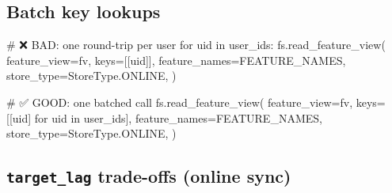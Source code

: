 \documentclass[
  letterpaper,
  DIV=11,
  numbers=noendperiod]{scrreprt}
\newenvironment{Shaded}{\begin{snugshade}}{\end{snugshade}}
\newcommand{\CommentTok}[1]{\textcolor[rgb]{0.37,0.37,0.37}{#1}}
\newcommand{\ControlFlowTok}[1]{\textcolor[rgb]{0.00,0.23,0.31}{#1}}
\newcommand{\KeywordTok}[1]{\textcolor[rgb]{0.00,0.23,0.31}{#1}}
\newcommand{\NormalTok}[1]{\textcolor[rgb]{0.00,0.23,0.31}{#1}}
\newcommand{\OperatorTok}[1]{\textcolor[rgb]{0.37,0.37,0.37}{#1}}
\begin{document}
\hypertarget{batch-key-lookups}{%
\subsection{Batch key lookups}\label{batch-key-lookups}}

\begin{Shaded}
\begin{Highlighting}[]
\CommentTok{\# ❌ BAD: one round{-}trip per user}
\ControlFlowTok{for}\NormalTok{ uid }\KeywordTok{in}\NormalTok{ user\_ids:}
\NormalTok{    fs.read\_feature\_view(}
\NormalTok{        feature\_view}\OperatorTok{=}\NormalTok{fv,}
\NormalTok{        keys}\OperatorTok{=}\NormalTok{[[uid]],}
\NormalTok{        feature\_names}\OperatorTok{=}\NormalTok{FEATURE\_NAMES,}
\NormalTok{        store\_type}\OperatorTok{=}\NormalTok{StoreType.ONLINE,}
\NormalTok{    )}

\CommentTok{\# ✅ GOOD: one batched call}
\NormalTok{fs.read\_feature\_view(}
\NormalTok{    feature\_view}\OperatorTok{=}\NormalTok{fv,}
\NormalTok{    keys}\OperatorTok{=}\NormalTok{[[uid] }\ControlFlowTok{for}\NormalTok{ uid }\KeywordTok{in}\NormalTok{ user\_ids],}
\NormalTok{    feature\_names}\OperatorTok{=}\NormalTok{FEATURE\_NAMES,}
\NormalTok{    store\_type}\OperatorTok{=}\NormalTok{StoreType.ONLINE,}
\NormalTok{)}
\end{Highlighting}
\end{Shaded}

\hypertarget{target_lag-trade-offs-online-sync}{%
\subsection{\texorpdfstring{\texttt{target\_lag} trade-offs (online
sync)}{target\_lag trade-offs (online sync)}}\label{target_lag-trade-offs-online-sync}}
\end{document}
